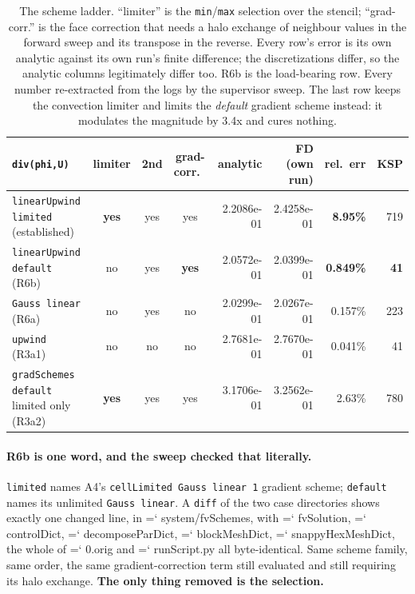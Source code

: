 \documentclass[11pt,a4paper]{article}
\newcommand{\artifact}[1]{{\small\ttfamily\hyphenchar\font=`\-\relax
  \def\_{\textunderscore\allowbreak}#1}}
\begin{document}
\begin{table}[htbp]
\centering
\footnotesize
\begin{tabular}{@{}L{4.0cm}ccc rrrr@{}}
\toprule
\texttt{div(phi,U)} & limiter & 2nd & grad-corr.\ & analytic & FD (own run) & rel.\ err & KSP \\
\midrule
\texttt{linearUpwind limited} (established) & \textbf{yes} & yes & yes & 2.2086e-01 & 2.4258e-01 & \textbf{8.95\%} & 719 \\
\texttt{linearUpwind default} (R6b) & no & yes & \textbf{yes} & 2.0572e-01 & 2.0399e-01 & \textbf{0.849\%} & \textbf{41} \\
\texttt{Gauss linear} (R6a) & no & yes & no & 2.0299e-01 & 2.0267e-01 & 0.157\% & 223 \\
\texttt{upwind} (R3a1) & no & no & no & 2.7681e-01 & 2.7670e-01 & 0.041\% & 41 \\
\addlinespace
\texttt{gradSchemes default} limited only (R3a2) & \textbf{yes} & yes & yes & 3.1706e-01 & 3.2562e-01 & 2.63\% & 780 \\
\bottomrule
\end{tabular}
\caption{The scheme ladder. ``limiter'' is the \texttt{min}/\texttt{max} selection over the
stencil; ``grad-corr.'' is the face correction that needs a halo exchange of neighbour values
in the forward sweep and its transpose in the reverse. Every row's error is its own analytic
against its own run's finite difference; the discretizations differ, so the analytic columns
legitimately differ too. R6b is the load-bearing row. Every number re-extracted from the
logs by the supervisor sweep. The last row keeps the convection limiter and limits the
\emph{default} gradient scheme instead: it modulates the magnitude by 3.4x and cures
nothing.}
\label{tab:schemeladder}
\end{table}

\paragraph{R6b is one word, and the sweep checked that literally.} \texttt{limited} names
A4's \texttt{cellLimited Gauss linear 1} gradient scheme; \texttt{default} names its
unlimited \texttt{Gauss linear}. A \texttt{diff} of the two case directories shows exactly
one changed line, in \artifact{system/fvSchemes}, with \artifact{fvSolution},
\artifact{controlDict}, \artifact{decomposeParDict}, \artifact{blockMeshDict},
\artifact{snappyHexMeshDict}, the whole of \artifact{0.orig} and \artifact{runScript.py} all
byte-identical. Same scheme family, same order, the same gradient-correction term still
evaluated and still requiring its halo exchange. \textbf{The only thing removed is the
selection.}
\end{document}
